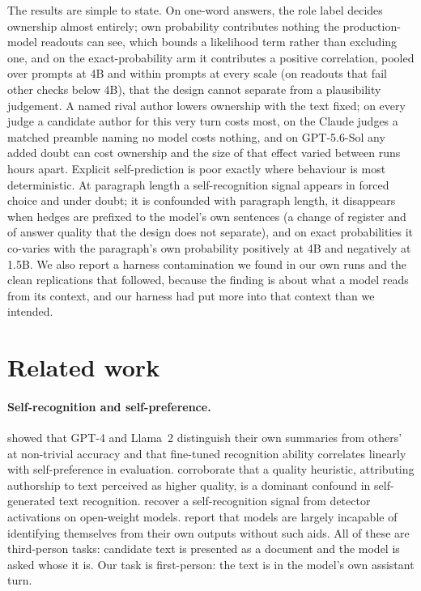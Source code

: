 \documentclass[twocolumn,10pt]{article}
\newcommand{\gpt}{GPT-5.6-Sol}
\begin{document}
The results are simple to state. On one-word answers, the role label decides ownership almost entirely; own probability contributes nothing the production-model readouts can see, which bounds a likelihood term rather than excluding one, and on the exact-probability arm it contributes a positive correlation, pooled over prompts at 4B and within prompts at every scale (on readouts that fail other checks below 4B), that the design cannot separate from a plausibility judgement. A named rival author lowers ownership with the text fixed; on every judge a candidate author for this very turn costs most, on the Claude judges a matched preamble naming no model costs nothing, and on \gpt{} any added doubt can cost ownership and the size of that effect varied between runs hours apart. Explicit self-prediction is poor exactly where behaviour is most deterministic. At paragraph length a self-recognition signal appears in forced choice and under doubt; it is confounded with paragraph length, it disappears when hedges are prefixed to the model's own sentences (a change of register and of answer quality that the design does not separate), and on exact probabilities it co-varies with the paragraph's own probability positively at 4B and negatively at 1.5B. We also report a harness contamination we found in our own runs and the clean replications that followed, because the finding is about what a model reads from its context, and our harness had put more into that context than we intended.

\section{Related work}

\paragraph{Self-recognition and self-preference.} \citet{panickssery2024llm} showed that GPT-4 and Llama~2 distinguish their own summaries from others' at non-trivial accuracy and that fine-tuned recognition ability correlates linearly with self-preference in evaluation. \citet{stamand2026selfgenerated} corroborate that a quality heuristic, attributing authorship to text perceived as higher quality, is a dominant confound in self-generated text recognition. \citet{ardoin2026llm} recover a self-recognition signal from detector activations on open-weight models. \citet{bai2025know} report that models are largely incapable of identifying themselves from their own outputs without such aids. All of these are third-person tasks: candidate text is presented as a document and the model is asked whose it is. Our task is first-person: the text is in the model's own assistant turn.
\end{document}

